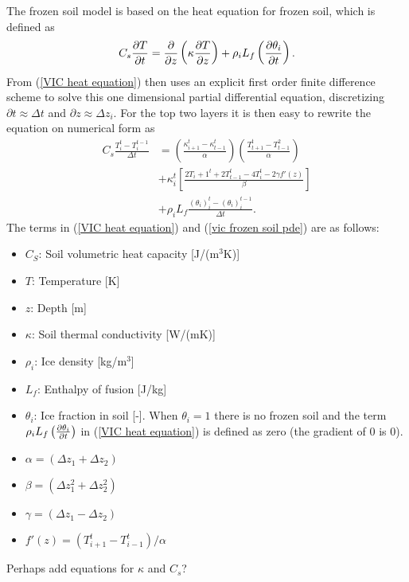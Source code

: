 The frozen soil model is based on the heat equation for frozen soil, which 
is defined as 
\begin{equation}
C_s\pdv{T}{t}=\pdv{}{z}\left( \kappa \pdv{T}{z} \right) + \rho_i L_f \left( \pdv{\theta_i}{t}\right).
\label{VIC heat equation}
\end{equation}
From (\ref{VIC heat equation}) \cite{VICFrozenSoil} then uses an explicit first order 
finite difference scheme to solve this one dimensional partial differential 
equation, discretizing $\partial t\approx \Delta t$ and $\partial z \approx \Delta z_i$.
For the top two layers it is then easy to rewrite the equation on numerical form as
\begin{align}
	C_s\frac{T_i^t - T_i^{t-1}}{\Delta t} &= \left( \frac{\kappa_{i+1}^t - 
	\kappa_{t-1}^t}{\alpha}\right) \left( \frac{T_{t+1}^t - T_{t-1}^2}{\alpha} 
	\right)\nonumber \\ &+ \kappa_i^t \left[ \frac{2T_i+1^t + 2T_{t-1}^t - 4T_i^t - 2\gamma 
	f'(z)}{\beta}  \right] \nonumber \\ &+ \rho_i L_f \frac{(\theta_i)_i^t - 
    (\theta_i)_i^{t-1}}{\Delta t}. \label{vic frozen soil pde}
\end{align}
The terms in (\ref{VIC heat equation}) and (\ref{vic frozen soil pde}) are as follows:
\begin{itemize}
    \item $C_S$: Soil volumetric heat capacity [J/(m$^3$K)]
    \item $T$: Temperature [K]
    \item $z$: Depth [m]
    \item $\kappa$: Soil thermal conductivity [W/(mK)]
    \item $\rho_i$: Ice density [kg/m$^3$]
    \item $L_f$: Enthalpy of fusion [J/kg]
    \item $\theta_i$: Ice fraction in soil [-]. When $\theta_i=1$ there is no frozen soil and the term $\rho_i L_f\left( \pdv{\theta_i}{t}\right) $ in (\ref{VIC heat equation}) is defined as zero (the gradient of 0 is 0).
    \item $\alpha = (\Delta z_1 + \Delta z_2)$
    \item $\beta = (\Delta z_1^2 + \Delta z_2^2)$
    \item $\gamma = (\Delta z_1 - \Delta z_2)$
    \item $f'(z)=(T_{i+1}^t - T_{i-1}^t) / \alpha$
\end{itemize}


Perhaps add equations for $\kappa$ and $C_s$?


